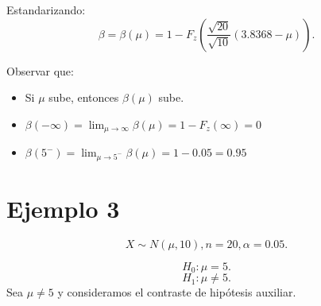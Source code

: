 \documentclass{article}
\begin{document}
Estandarizando:
\[\beta=\beta(\mu)=1-F_{z}(\frac{\sqrt{20}}{\sqrt{10}}(3.8368-\mu)).\]

Observar que:
\begin{itemize}
	\item Si $\mu$ sube, entonces $\beta(\mu)$ sube.
	\item $\beta(-\infty)=\lim_{\mu \rightarrow \infty} \beta(\mu)=1-F_{z}(\infty)=0$
	\item $\beta(5^{-})=\lim_{\mu \rightarrow 5^{-}}\beta(\mu)=1-0.05=0.95$
\end{itemize}

\section{Ejemplo 3}
\[X\sim N(\mu,10), n=20, \alpha=0.05.\]

\[H_{0}:\mu=5.\]
\[H_{1}:\mu \neq 5.\]
Sea $\mu \neq 5$ y consideramos el contraste de hipótesis auxiliar.
\end{document}
